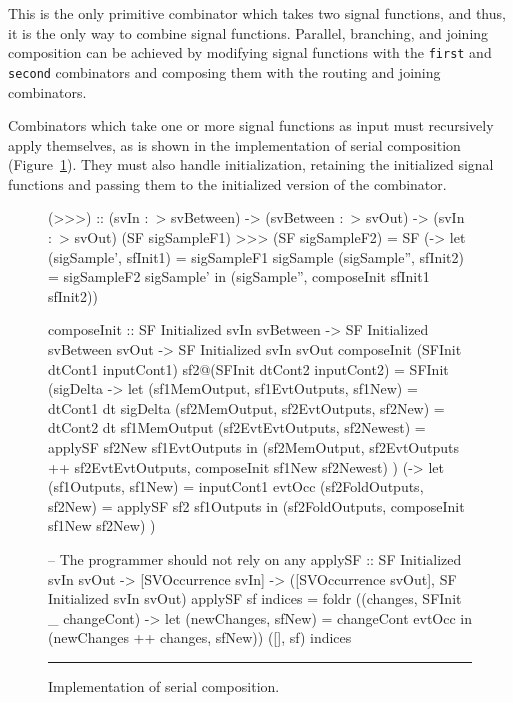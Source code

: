 This is the only primitive combinator which takes two signal functions, and
thus, it is the only way to combine signal functions. Parallel, branching, and
joining composition can be achieved by modifying signal functions with the
{\tt first} and {\tt second} combinators and composing them with the
routing and joining combinators.

Combinators which take one or more signal functions as input must recursively
apply themselves, as is shown in the implementation of serial composition
(Figure~\ref{figure:serial_composition_implementation}). They must also
handle initialization, retaining the initialized signal functions and passing
them to the initialized version of the combinator.

\begin{figure}
\begin{code}
(>>>) ::    (svIn :~> svBetween) 
         -> (svBetween :~> svOut)
         -> (svIn :~> svOut)
(SF sigSampleF1) >>> (SF sigSampleF2) =
  SF (\sigSample -> let (sigSample', sfInit1) = sigSampleF1 sigSample
                        (sigSample'', sfInit2) = sigSampleF2 sigSample'
                    in (sigSample'', composeInit sfInit1 sfInit2))

composeInit ::     SF Initialized svIn svBetween
                -> SF Initialized svBetween svOut
                -> SF Initialized svIn svOut
composeInit (SFInit dtCont1 inputCont1) sf2@(SFInit dtCont2 inputCont2) =
  SFInit
    (\dt sigDelta -> 
       let (sf1MemOutput, sf1EvtOutputs, sf1New) = dtCont1 dt sigDelta
           (sf2MemOutput, sf2EvtOutputs, sf2New) = dtCont2 dt sf1MemOutput
           (sf2EvtEvtOutputs, sf2Newest) = applySF sf2New sf1EvtOutputs
       in (sf2MemOutput,
           sf2EvtOutputs ++ sf2EvtEvtOutputs,
           composeInit sf1New sf2Newest)
    )
    (\evtOcc -> 
      let (sf1Outputs, sf1New) = inputCont1 evtOcc
          (sf2FoldOutputs, sf2New) = applySF sf2 sf1Outputs
      in (sf2FoldOutputs, composeInit sf1New sf2New)   
    )

-- The programmer should not rely on any 
applySF ::    SF Initialized svIn svOut
           -> [SVOccurrence svIn]
           -> ([SVOccurrence svOut],
               SF Initialized svIn svOut)
applySF sf indices =
  foldr (\evtOcc (changes, SFInit _ changeCont) ->
           let (newChanges, sfNew) = changeCont evtOcc
               in (newChanges ++ changes, sfNew))
        ([], sf)
        indices
\end{code}
\hrule
\caption{Implementation of serial composition.}
\label{figure:serial_composition_implementation}
\end{figure}

